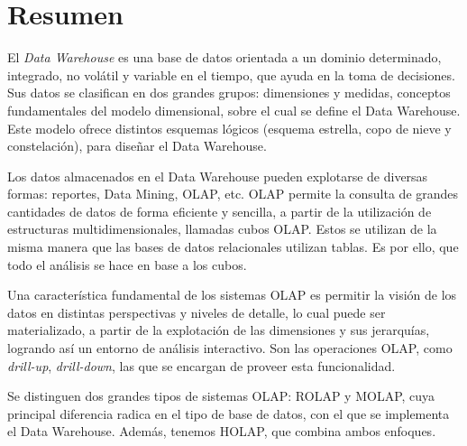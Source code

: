 \documentclass[a4paper,11pt]{article}
\begin{document}
  
  \newpage\null\thispagestyle{empty}\newpage
  \maketitle
  \tableofcontents
  \newpage
  

    \section{Resumen}
  
    El \textit{Data Warehouse} es una base de datos orientada a un dominio determinado, integrado, no volátil y variable en el tiempo, que ayuda en la toma de decisiones.
    Sus datos se clasifican en dos grandes grupos: dimensiones y medidas, conceptos fundamentales del modelo dimensional, sobre el cual se define el
    Data Warehouse. Este modelo ofrece distintos esquemas lógicos
    (esquema estrella, copo de nieve y constelación), para diseñar el Data Warehouse. 
    
    Los datos almacenados en el Data Warehouse pueden explotarse de diversas formas:
    reportes, Data Mining, OLAP, etc. OLAP permite la consulta de grandes cantidades de datos de forma eficiente y sencilla, a partir de la utilización de 
    estructuras multidimensionales, llamadas cubos OLAP.
    Estos se utilizan de la misma manera que las bases de datos relacionales utilizan tablas.
    Es por ello, que todo el análisis se hace en base a los cubos.
    
    Una característica fundamental de los sistemas OLAP es permitir la visión de los datos en distintas perspectivas y niveles de detalle, lo cual
    puede ser materializado, a partir de la explotación de las dimensiones y sus jerarquías, logrando así un entorno de análisis interactivo.
    Son las operaciones OLAP, como \textit{drill-up}, \textit{drill-down}, las que se encargan de proveer esta funcionalidad.
    
    Se distinguen dos grandes tipos de sistemas OLAP: ROLAP y MOLAP, cuya principal diferencia radica en el tipo de base de datos, con el que se implementa el
    Data Warehouse. Además, tenemos HOLAP, que combina ambos enfoques.
\end{document}
